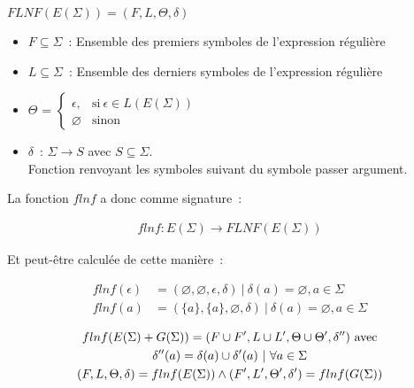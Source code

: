 \documentclass[12pt]{article}
\begin{document}
\begin{center}
    \(FLNF(E(\Sigma)) = (F, L, \Theta, \delta)\)

    \begin{itemize}
        \item[\textbullet] \(F \subseteq \Sigma\)~: Ensemble des premiers
            symboles de l'expression régulière

            \vphantom{}

        \item[\textbullet] \(L \subseteq \Sigma\)~: Ensemble des derniers
            symboles de l'expression régulière

            \vphantom{}

        \item[\textbullet] \(\Theta\) =
            \(
            \begin{cases}
                \epsilon,   & \text{si}~ \epsilon \in L(E(\Sigma)) \\
                \varnothing & \text{sinon}
            \end{cases}
            \)

            \vphantom{}

        \item[\textbullet] \(\delta\)~: \(\Sigma \to S\) avec \(S \subseteq
            \Sigma\). \\
            Fonction renvoyant les symboles suivant du symbole passer argument.
    \end{itemize}
\end{center}

La fonction \(flnf\) a donc comme signature~:

\begin{align}
    flnf: E(\Sigma) \to FLNF(E(\Sigma))
\end{align}

Et peut-être calculée de cette manière~:

\begin{align}
    flnf(\epsilon) & = (\varnothing, \varnothing, \epsilon, \delta) ~|~ \delta(a) = \varnothing, a \in \Sigma \\
    flnf(a)        & = (\{a\}, \{a\}, \varnothing, \delta) ~|~ \delta(a) = \varnothing, a
    \in \Sigma
\end{align}

\begin{gather}
    flnf(E(\Sigma) + G(\Sigma)) = (F \cup F', L \cup L', \Theta \cup \Theta', \delta'')~ \text{avec} \\
    \delta''(a) = \delta(a) \cup \delta'(a) ~|~ \forall a \in \Sigma \notag \\
    (F, L, \Theta, \delta) = flnf(E(\Sigma)) \land (F', L', \Theta', \delta') = flnf(G(\Sigma)) \notag
\end{gather}
\end{document}
